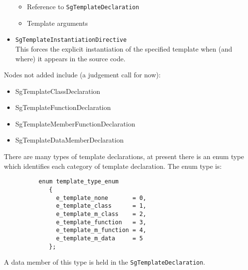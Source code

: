 \begin{itemize}
\begin{itemize}
               \item Reference to {\tt SgTemplateDeclaration}
               \item Template arguments
          \end{itemize}
     \item {\tt SgTemplateInstantiationDirective} \\
           This forces the explicit instantiation of the specified template when (and
           where) it appears in the source code.
\end{itemize}

Nodes not added include (a judgement call for now):
\begin{itemize}
     \item SgTemplateClassDeclaration
     \item SgTemplateFunctionDeclaration
     \item SgTemplateMemberFunctionDeclaration
     \item SgTemplateDataMemberDeclaration
\end{itemize}
There are many types of template declarations, at present there is an enum type
which identifies each category of template declaration.  The enum type is:

{\indent
{\mySmallFontSize

\begin{verbatim}
          enum template_type_enum 
             {
               e_template_none       = 0,
               e_template_class      = 1,
               e_template_m_class    = 2,
               e_template_function   = 3,
               e_template_m_function = 4,
               e_template_m_data     = 5
             };
\end{verbatim}
}}

A data member of this type is held in the {\tt SgTemplateDeclaration}.


